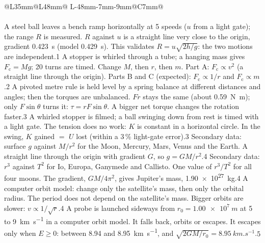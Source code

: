 {\small
\setlength\LTpre{4pt}\setlength\LTpost{6pt}
\renewcommand\arraystretch{1.25}
\begin{longtable}{@{}L{35mm}@{\hspace{3mm}}L{48mm}@{\hspace{3mm}}%
    L{\dimexpr\linewidth-35mm-48mm-7mm-9mm\relax}@{\hspace{3mm}}C{7mm}@{}}
  \kxhead\\\hline\endfirsthead
  \kxhead\\\hline\endhead
    {A steel ball leaves a bench ramp horizontally at 5 speeds ($u$ from a light gate); the
     range $R$ is measured.}
    {$R$ against $u$ is a straight line very close to the origin, gradient \qty{0.423}{s} (model
     \qty{0.429}{s}). This validates $R = u\sqrt{2h/g}$: the two motions are independent.}{1}
    {A stopper is whirled through a tube; a hanging mass gives $F_\mathrm{c} = Mg$; 20 turns are
     timed. Change $M$, then $r$, then $m$.}
    {Part A: $F_\mathrm{c} \propto v^2$ (a straight line through the origin). Parts B and C
     (expected): $F_\mathrm{c} \propto 1/r$ and $F_\mathrm{c} \propto m$.}{2}
    {A pivoted metre rule is held level by a spring balance at different distances and
     angles; then the torques are unbalanced.}
    {$Fr$ stays the same (about \qty{0.59}{N.m}); only $F\sin\theta$ turns it:
     $\tau = rF\sin\theta$. A bigger net torque changes the rotation faster.}{3}
    {A whirled stopper is filmed; a ball swinging down from rest is timed with a light gate.}
    {The tension does no work: $K$ is constant in a horizontal circle. In the swing, $K$
     gained $=$ $U$ lost (within a 3\,\% light-gate error).}{3}
    {Secondary data: surface $g$ against $M/r^2$ for the Moon, Mercury, Mars, Venus and the
     Earth.}
    {A straight line through the origin with gradient $G$, so $g = GM/r^2$.}{4}
    {Secondary data: $r^3$ against $T^2$ for Io, Europa, Ganymede and Callisto.}
    {One value of $r^3/T^2$ for all four moons. The gradient, $GM/4\pi^2$, gives Jupiter's
     mass, \qty{1.90e27}{kg}.}{4}
    {A computer orbit model: change only the satellite's mass, then only the orbital radius.}
    {The period does not depend on the satellite's mass. Bigger orbits are slower:
     $v \propto 1/\sqrt{r}$.}{4}
    {A probe is launched sideways from $r_0 = \qty{1.00e7}{m}$ at 5 to \qty{9}{km.s^{-1}} in a
     computer orbit model.}
    {It falls back, orbits or escapes. It escapes only when $E \ge 0$: between 8.94 and
     \qty{8.95}{km.s^{-1}}, and $\sqrt{2GM/r_0} = \qty{8.95}{km.s^{-1}}$.}{5}
\end{longtable}}

